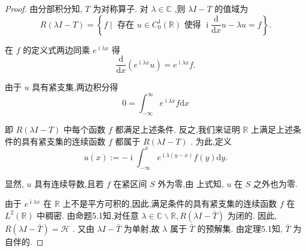 \documentclass[lang=cn,newtx,10pt,scheme=chinese,thmcnt=chapter]{elegantbook}
\newcommand{\dif}{\mathrm{d}}
\newcommand{\ci}{\operatorname{i}}
\begin{document}
\begin{proof}
由分部积分知, \(T\) 为对称算子. 对 \(\lambda  \in  \mathbb{C}\) ,则 \({\lambda I} - T\) 的值域为
\begin{equation*}
R\left( {{\lambda I} - T}\right)  = \left\{  {f \mid  \text{ 存在 }u \in  {C}_{0}^{1}\left( \mathbb{R}\right) \text{ 使得 }\ci\frac{\dif}{\dif x}u - {\lambda u} = f}\right\}  .
\end{equation*}

在 \(f\) 的定义式两边同乘 \({e}^{\ci\lambda x}\) 得
\begin{equation*}
\frac{\dif}{\dif x}\left( {{e}^{\ci\lambda x}u}\right)  = {e}^{\ci\lambda x}f.
\end{equation*}

由于 \(u\) 具有紧支集,两边积分得
\begin{equation*}
0 = {\int }_{-\infty }^{\infty }{e}^{\ci\lambda x}{f\dif x} \label{5.8}
\end{equation*}

即 \(R\left( {{\lambda I} - T}\right)\) 中每个函数 \(f\) 都满足上述条件. 反之,我们来证明 \(\mathbb{R}\) 上满足上述条件的具有紧支集的连续函数 \(f\) 都属于 \(R\left( {{\lambda I} - T}\right)\) . 为此,定义
\begin{equation*}
u\left( x\right)  \mathrel{\text{ := }}  - \ci{\int }_{-\infty }^{x}{e}^{{\ci\lambda }\left( {y - x}\right) }f\left( y\right) {\dif y}. \label{5.9}
\end{equation*}

显然, \(u\) 具有连续导数,且若 \(f\) 在紧区间 \(S\) 外为零,由 上式知, \(u\) 在 \(S\) 之外也为零.

由于 \({e}^{\ci\lambda x}\) 在 \(\mathbb{R}\) 上不是平方可积的,因此,满足条件的具有紧支集的连续函数 \(f\) 在 \({L}^{2}\left( \mathbb{R}\right)\) 中稠密. 由命题5.1知,对任意 \(\lambda  \in  \mathbb{C} \smallsetminus  \mathbb{R},R\left( {{\lambda I} - \bar{T}}\right)\) 为闭的. 因此, \(R\left( {{\lambda I} - \bar{T}}\right)  = \mathcal{H}\) . 又由 \({\lambda I} - \bar{T}\) 为单射,故 \(\lambda\) 属于 \(\bar{T}\) 的预解集. 由定理5.1知, \(\bar{T}\) 为自伴的.
\end{proof}
\end{document}
